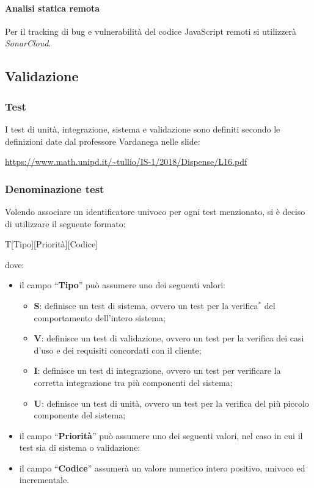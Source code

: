 \documentclass[11pt,a4paper]{article}
\begin{document}
{	\paragraph{Analisi statica remota\\}

	Per il tracking di bug e vulnerabilità del codice JavaScript remoti si utilizzerà \textit{SonarCloud}.
	
			
	\subsection{Validazione}
	\subsubsection{Test}
	I test di unità, integrazione, sistema e validazione sono definiti secondo le definizioni date dal professore Vardanega nelle slide: \begin{center}
		\url{https://www.math.unipd.it/~tullio/IS-1/2018/Dispense/L16.pdf}
	\end{center}
	
	\subsubsection{Denominazione test}
	Volendo associare un identificatore univoco per ogni test menzionato, si \`e deciso di utilizzare il seguente formato:
	\begin{center}
		T[Tipo][Priorità][Codice]
	\end{center}
	dove:
	\begin{itemize}
		
		\item il campo “\textbf{Tipo}” può assumere uno dei seguenti valori:
		\begin{itemize}
			\item \textbf{S}: definisce un test di sistema, ovvero un test per la verifica$^*$ del comportamento dell'intero sistema;
			\item \textbf{V}: definisce un test di validazione, ovvero un test per la verifica dei casi d'uso e dei requisiti concordati con il cliente;
			\item \textbf{I}: definisce un test di integrazione, ovvero un test per verificare la corretta integrazione tra più componenti del sistema;
			\item \textbf{U}: definisce un test di unità, ovvero un test per la verifica del più piccolo componente del sistema;
		\end{itemize}
	\item il campo “\textbf{Priorità}” può assumere uno dei seguenti valori, nel caso in cui il test sia di sistema o validazione:
		\item il campo “\textbf{Codice}” assumerà un valore numerico intero positivo, univoco ed incrementale.
	\end{itemize}
\begin{itemize}
	

\end{itemize}}
\end{document}
